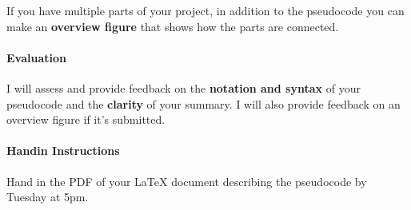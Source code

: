 \documentclass{sig-alternate-05-2015}
\begin{document}
\noindent If you have multiple parts of your project, in addition to the pseudocode you can make an \textbf{overview figure} that shows how the parts are connected.  

\paragraph{Evaluation}  I will assess and provide feedback on the \textbf{notation and syntax} of your pseudocode and the \textbf{clarity} of your summary. I will also provide feedback on an overview figure if it's submitted.

\paragraph{Handin Instructions} Hand in the PDF of your LaTeX document describing the pseudocode by Tuesday at 5pm.
\end{document}
